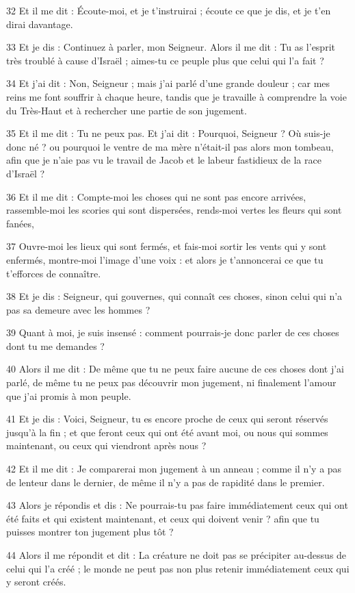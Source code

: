 \par 32 Et il me dit : Écoute-moi, et je t'instruirai ; écoute ce que je dis, et je t'en dirai davantage.
\par 33 Et je dis : Continuez à parler, mon Seigneur. Alors il me dit : Tu as l'esprit très troublé à cause d'Israël ; aimes-tu ce peuple plus que celui qui l'a fait ?
\par 34 Et j'ai dit : Non, Seigneur ; mais j'ai parlé d'une grande douleur ; car mes reins me font souffrir à chaque heure, tandis que je travaille à comprendre la voie du Très-Haut et à rechercher une partie de son jugement.
\par 35 Et il me dit : Tu ne peux pas. Et j'ai dit : Pourquoi, Seigneur ? Où suis-je donc né ? ou pourquoi le ventre de ma mère n'était-il pas alors mon tombeau, afin que je n'aie pas vu le travail de Jacob et le labeur fastidieux de la race d'Israël ?
\par 36 Et il me dit : Compte-moi les choses qui ne sont pas encore arrivées, rassemble-moi les scories qui sont dispersées, rends-moi vertes les fleurs qui sont fanées,
\par 37 Ouvre-moi les lieux qui sont fermés, et fais-moi sortir les vents qui y sont enfermés, montre-moi l'image d'une voix : et alors je t'annoncerai ce que tu t'efforces de connaître.
\par 38 Et je dis : Seigneur, qui gouvernes, qui connaît ces choses, sinon celui qui n'a pas sa demeure avec les hommes ?
\par 39 Quant à moi, je suis insensé : comment pourrais-je donc parler de ces choses dont tu me demandes ?
\par 40 Alors il me dit : De même que tu ne peux faire aucune de ces choses dont j'ai parlé, de même tu ne peux pas découvrir mon jugement, ni finalement l'amour que j'ai promis à mon peuple.
\par 41 Et je dis : Voici, Seigneur, tu es encore proche de ceux qui seront réservés jusqu'à la fin ; et que feront ceux qui ont été avant moi, ou nous qui sommes maintenant, ou ceux qui viendront après nous ?
\par 42 Et il me dit : Je comparerai mon jugement à un anneau ; comme il n'y a pas de lenteur dans le dernier, de même il n'y a pas de rapidité dans le premier.
\par 43 Alors je répondis et dis : Ne pourrais-tu pas faire immédiatement ceux qui ont été faits et qui existent maintenant, et ceux qui doivent venir ? afin que tu puisses montrer ton jugement plus tôt ?
\par 44 Alors il me répondit et dit : La créature ne doit pas se précipiter au-dessus de celui qui l'a créé ; le monde ne peut pas non plus retenir immédiatement ceux qui y seront créés.
